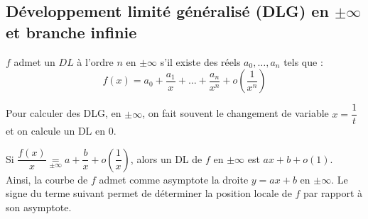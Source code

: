     \subsection{Développement limité généralisé (DLG) en $\pm \infty$ et branche infinie}

        $f$ admet un $DL$ à l'ordre $n$ en $\pm \infty$ s'il existe des réels $a_0, \dots, a_n$ tels que :\\
        \[f(x) = a_0 + \frac{a_1}{x} + \dots + \frac{a_n}{x^n} + o\left(\frac{1}{x^n}\right)\]

        Pour calculer des DLG, en $\pm \infty$, on fait souvent le changement de variable $x = \dfrac{1}{t}$ et on calcule un DL en $0$.

        Si $\dfrac{f(x)}{x} \underset{\pm \infty}{=} a + \dfrac{b}{x} + o\left(\dfrac{1}{x}\right)$, alors un DL de $f$ en $\pm \infty$ est $ax + b + o(1)$.\\

        Ainsi, la courbe de $f$ admet comme asymptote la droite $y = ax + b$ en $\pm \infty$.
        Le signe du terme suivant permet de déterminer la position locale de $f$ par rapport à son asymptote.
